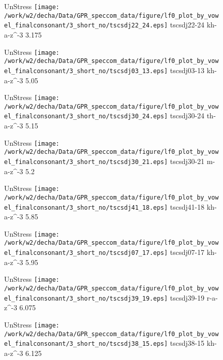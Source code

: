 \documentclass{article}
\begin{document}
\begin{figure}[t]
\begin{minipage}[b]{.24\textwidth}
UnStress
\centering
\texttt{[image: /work/w2/decha/Data/GPR\_speccom\_data/figure/lf0\_plot\_by\_vowel\_finalconsonant/3\_short\_no/tscsdj22\_24.eps]}
tscsdj22-24 kh-a-z\textasciicircum-3 3.175
\end{minipage}
\begin{minipage}[b]{.24\textwidth}
UnStress
\centering
\texttt{[image: /work/w2/decha/Data/GPR\_speccom\_data/figure/lf0\_plot\_by\_vowel\_finalconsonant/3\_short\_no/tscsdj03\_13.eps]}
tscsdj03-13 kh-a-z\textasciicircum-3 5.05
\end{minipage}
\begin{minipage}[b]{.24\textwidth}
UnStress
\centering
\texttt{[image: /work/w2/decha/Data/GPR\_speccom\_data/figure/lf0\_plot\_by\_vowel\_finalconsonant/3\_short\_no/tscsdj30\_24.eps]}
tscsdj30-24 th-a-z\textasciicircum-3 5.15
\end{minipage}
\begin{minipage}[b]{.24\textwidth}
UnStress
\centering
\texttt{[image: /work/w2/decha/Data/GPR\_speccom\_data/figure/lf0\_plot\_by\_vowel\_finalconsonant/3\_short\_no/tscsdj30\_21.eps]}
tscsdj30-21 m-a-z\textasciicircum-3 5.2
\end{minipage}
\end{figure}

\begin{figure}[t]
\begin{minipage}[b]{.24\textwidth}
UnStress
\centering
\texttt{[image: /work/w2/decha/Data/GPR\_speccom\_data/figure/lf0\_plot\_by\_vowel\_finalconsonant/3\_short\_no/tscsdj41\_18.eps]}
tscsdj41-18 kh-a-z\textasciicircum-3 5.85
\end{minipage}
\begin{minipage}[b]{.24\textwidth}
UnStress
\centering
\texttt{[image: /work/w2/decha/Data/GPR\_speccom\_data/figure/lf0\_plot\_by\_vowel\_finalconsonant/3\_short\_no/tscsdj07\_17.eps]}
tscsdj07-17 kh-a-z\textasciicircum-3 5.95
\end{minipage}
\begin{minipage}[b]{.24\textwidth}
UnStress
\centering
\texttt{[image: /work/w2/decha/Data/GPR\_speccom\_data/figure/lf0\_plot\_by\_vowel\_finalconsonant/3\_short\_no/tscsdj39\_19.eps]}
tscsdj39-19 r-a-z\textasciicircum-3 6.075
\end{minipage}
\begin{minipage}[b]{.24\textwidth}
UnStress
\centering
\texttt{[image: /work/w2/decha/Data/GPR\_speccom\_data/figure/lf0\_plot\_by\_vowel\_finalconsonant/3\_short\_no/tscsdj38\_15.eps]}
tscsdj38-15 kh-a-z\textasciicircum-3 6.125
\end{minipage}
\end{figure}
\end{document}
